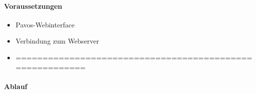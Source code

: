 \paragraph{Voraussetzungen}
\begin{itemize}
\item Pavos-Webinterface
\item Verbindung zum Webserver

\item =========================================================

\end{itemize}
\paragraph{Ablauf}
